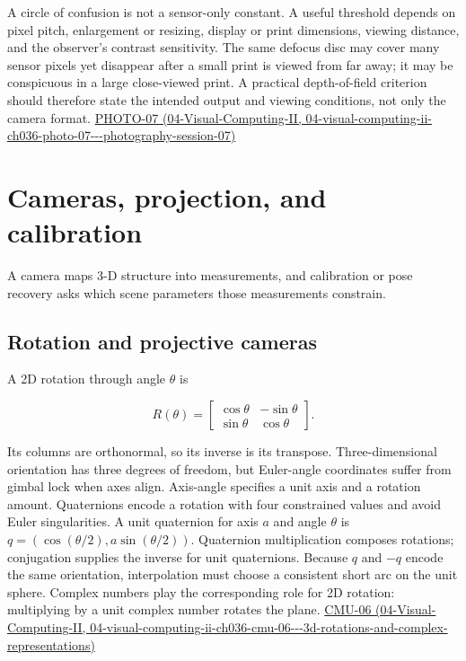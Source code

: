 A circle of confusion is not a sensor-only constant. A useful threshold depends on pixel pitch, enlargement or resizing, display or print dimensions, viewing distance, and the observer's contrast sensitivity. The same defocus disc may cover many sensor pixels yet disappear after a small print is viewed from far away; it may be conspicuous in a large close-viewed print. A practical depth-of-field criterion should therefore state the intended output and viewing conditions, not only the camera format. \href{../04-Visual-Computing-II/main.pdf\#nameddest=04-visual-computing-ii-ch036-photo-07---photography-session-07}{PHOTO-07 (04-Visual-Computing-II, 04-visual-computing-ii-ch036-photo-07-\/-\/-photography-session-07)}

\section{Cameras, projection, and calibration}\label{03-visual-computing-i-ch003-cameras-projection-and-calibration}

A camera maps 3-D structure into measurements, and calibration or pose recovery asks which scene parameters those measurements constrain.

\subsection{Rotation and projective cameras}\label{03-visual-computing-i-ch003-rotation-and-projective-cameras}

A 2D rotation through angle \(\theta\) is

\[
R(\theta)=\begin{bmatrix}\cos\theta&-\sin\theta\\\sin\theta&\cos\theta\end{bmatrix}.
\]

Its columns are orthonormal, so its inverse is its transpose. Three-dimensional orientation has three degrees of freedom, but Euler-angle coordinates suffer from gimbal lock when axes align. Axis-angle specifies a unit axis and a rotation amount. Quaternions encode a rotation with four constrained values and avoid Euler singularities. A unit quaternion for axis \(a\) and angle \(\theta\) is \(q=(\cos(\theta/2),a\sin(\theta/2))\). Quaternion multiplication composes rotations; conjugation supplies the inverse for unit quaternions. Because \(q\) and \(-q\) encode the same orientation, interpolation must choose a consistent short arc on the unit sphere. Complex numbers play the corresponding role for 2D rotation: multiplying by a unit complex number rotates the plane. \href{../04-Visual-Computing-II/main.pdf\#nameddest=04-visual-computing-ii-ch036-cmu-06---3d-rotations-and-complex-representations}{CMU-06 (04-Visual-Computing-II, 04-visual-computing-ii-ch036-cmu-06-\/-\/-3d-rotations-and-complex-representations)}

